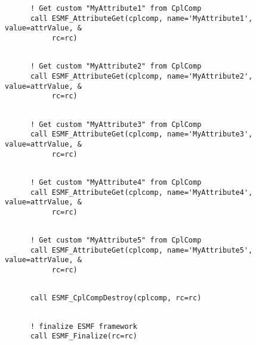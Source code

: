 \begin{verbatim}
      ! Get custom "MyAttribute1" from CplComp
      call ESMF_AttributeGet(cplcomp, name='MyAttribute1', value=attrValue, &
           rc=rc)
 
\end{verbatim}
 

 \begin{verbatim}
      ! Get custom "MyAttribute2" from CplComp
      call ESMF_AttributeGet(cplcomp, name='MyAttribute2', value=attrValue, &
           rc=rc)
 
\end{verbatim}
 

 \begin{verbatim}
      ! Get custom "MyAttribute3" from CplComp
      call ESMF_AttributeGet(cplcomp, name='MyAttribute3', value=attrValue, &
           rc=rc)
 
\end{verbatim}
 

 \begin{verbatim}
      ! Get custom "MyAttribute4" from CplComp
      call ESMF_AttributeGet(cplcomp, name='MyAttribute4', value=attrValue, &
           rc=rc)
 
\end{verbatim}
 

 \begin{verbatim}
      ! Get custom "MyAttribute5" from CplComp
      call ESMF_AttributeGet(cplcomp, name='MyAttribute5', value=attrValue, &
           rc=rc)
 
\end{verbatim}
 

 \begin{verbatim}
      call ESMF_CplCompDestroy(cplcomp, rc=rc)
 
\end{verbatim}
 

 \begin{verbatim}
      ! finalize ESMF framework
      call ESMF_Finalize(rc=rc)
 
\end{verbatim}

\setlength{\parskip}{\oldparskip}
\setlength{\parindent}{\oldparindent}
\setlength{\baselineskip}{\oldbaselineskip}
